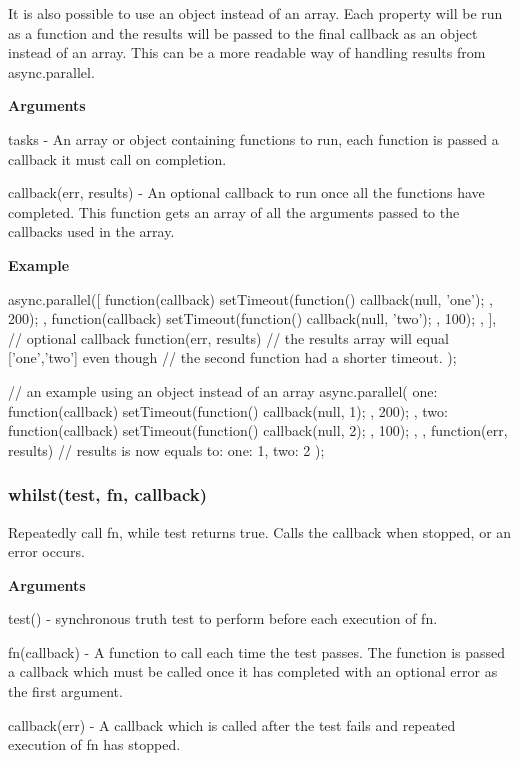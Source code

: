 It is also possible to use an object instead of an array. Each property will be run as a function and the results will be passed to the final callback as an object instead of an array. This can be a more readable way of handling results from async.\+parallel.

{\bfseries Arguments}


\begin{DoxyItemize}
\item tasks -\/ An array or object containing functions to run, each function is passed a callback it must call on completion.
\item callback(err, results) -\/ An optional callback to run once all the functions have completed. This function gets an array of all the arguments passed to the callbacks used in the array.
\end{DoxyItemize}

{\bfseries Example} \begin{DoxyVerb}async.parallel([
    function(callback){
        setTimeout(function(){
            callback(null, 'one');
        }, 200);
    },
    function(callback){
        setTimeout(function(){
            callback(null, 'two');
        }, 100);
    },
],
// optional callback
function(err, results){
    // the results array will equal ['one','two'] even though
    // the second function had a shorter timeout.
});


// an example using an object instead of an array
async.parallel({
    one: function(callback){
        setTimeout(function(){
            callback(null, 1);
        }, 200);
    },
    two: function(callback){
        setTimeout(function(){
            callback(null, 2);
        }, 100);
    },
},
function(err, results) {
    // results is now equals to: {one: 1, two: 2}
});
\end{DoxyVerb}






\label{_whilst}%
 \subsubsection*{whilst(test, fn, callback)}

Repeatedly call fn, while test returns true. Calls the callback when stopped, or an error occurs.

{\bfseries Arguments}


\begin{DoxyItemize}
\item test() -\/ synchronous truth test to perform before each execution of fn.
\item fn(callback) -\/ A function to call each time the test passes. The function is passed a callback which must be called once it has completed with an optional error as the first argument.
\item callback(err) -\/ A callback which is called after the test fails and repeated execution of fn has stopped.
\end{DoxyItemize}

